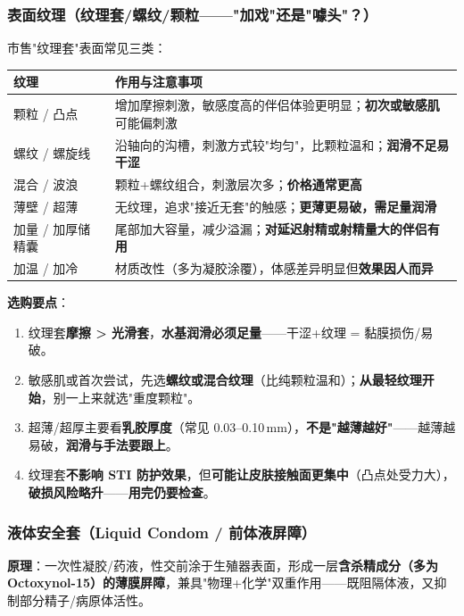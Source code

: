 \documentclass[12pt,UTF8,openany]{ctexbook}
\begin{document}
\subsubsection*{表面纹理（纹理套/螺纹/颗粒——"加戏"还是"噱头"？）}

市售"纹理套"表面常见三类：

\begin{center}
\footnotesize
\begin{tabularx}{\textwidth}{lX}
\toprule
\textbf{纹理} & \textbf{作用与注意事项} \\
\midrule
颗粒 / 凸点 & 增加摩擦刺激，敏感度高的伴侣体验更明显；\textbf{初次或敏感肌}可能偏刺激 \\
螺纹 / 螺旋线 & 沿轴向的沟槽，刺激方式较"均匀"，比颗粒温和；\textbf{润滑不足易干涩} \\
混合 / 波浪 & 颗粒+螺纹组合，刺激层次多；\textbf{价格通常更高} \\
薄壁 / 超薄 & 无纹理，追求"接近无套"的触感；\textbf{更薄更易破，需足量润滑} \\
加量 / 加厚储精囊 & 尾部加大容量，减少溢漏；\textbf{对延迟射精或射精量大的伴侣有用} \\
加温 / 加冷 & 材质改性（多为凝胶涂覆），体感差异明显但\textbf{效果因人而异} \\
\bottomrule
\end{tabularx}
\end{center}

\noindent \textbf{选购要点}：
\begin{enumerate}[leftmargin=2em,itemsep=0.3em]
  \item 纹理套\textbf{摩擦 > 光滑套}，\textbf{水基润滑必须足量}——干涩+纹理 = 黏膜损伤/易破。
  \item 敏感肌或首次尝试，先选\textbf{螺纹或混合纹理}（比纯颗粒温和）；\textbf{从最轻纹理开始}，别一上来就选"重度颗粒"。
  \item 超薄/超厚主要看\textbf{乳胶厚度}（常见 0.03--0.10\,mm），\textbf{不是"越薄越好"}——越薄越易破，\textbf{润滑与手法要跟上}。
  \item 纹理套\textbf{不影响 STI 防护效果}，但\textbf{可能让皮肤接触面更集中}（凸点处受力大），\textbf{破损风险略升}——\textbf{用完仍要检查}。
\end{enumerate}

\subsubsection*{液体安全套（Liquid Condom / 前体液屏障）}

\textbf{原理}：一次性凝胶/药液，性交前涂于生殖器表面，形成一层\textbf{含杀精成分（多为 Octoxynol-15）的薄膜屏障}，兼具"物理+化学"双重作用——既阻隔体液，又抑制部分精子/病原体活性。
\end{document}
